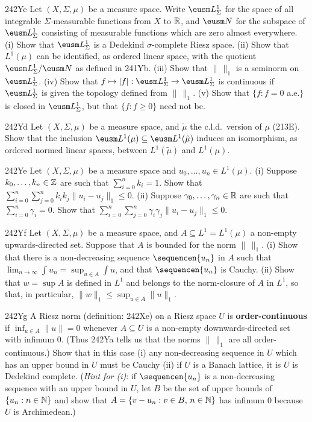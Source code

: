 {\spheader 242Yc Let $(X,\Sigma,\mu)$ be a measure space.   Write
$\eusm L^1_{\Sigma}$ for the space of all integrable
$\Sigma$-measurable functions
from $X$ to $\Bbb R$, and  $\eusm N$ for the subspace of
$\eusm L^1_{\Sigma}$ consisting of measurable functions which
are
zero almost everywhere.   (i) Show that $\eusm L^1_{\Sigma}$
is a
Dedekind $\sigma$-complete Riesz space.   (ii) Show that $L^1(\mu)$
can
be identified, as ordered linear space, with the quotient
$\eusm L^1_{\Sigma}/\eusm N$ as defined in 241Yb.   (iii) Show
that $\|\,\|_1$ is a seminorm on $\eusm L^1_{\Sigma}$.
(iv) Show that
$f\mapsto |f|:\eusm L^1_{\Sigma}\to\eusm L^1_{\Sigma}$
is continuous if $\eusm L^1_{\Sigma}$ is
given the topology defined from $\|\,\|_1$.   (v) Show that
$\{f:f=0$ a.e.$\}$ is closed in $\eusm L^1_{\Sigma}$, but that
$\{f:f\ge 0\}$ need not be.

\spheader 242Yd Let $(X,\Sigma,\mu)$ be a measure space, and
$\tilde\mu$ the c.l.d.\ version of $\mu$ (213E).   Show that the
inclusion $\eusm L^1(\mu)\subseteq\eusm L^1(\tilde\mu)$ induces an
isomorphism, as ordered normed linear spaces, between $L^1(\tilde\mu)$
and $L^1(\mu)$.

\spheader 242Ye Let $(X,\Sigma,\mu)$ be a measure space and
$u_0,\ldots,u_n\in L^1(\mu)$.   (i) Suppose $k_0,\ldots,k_n\in\Bbb Z$
are such that $\sum_{i=0}^nk_i=1$.   Show that
$\sum_{i=0}^n\sum_{j=0}^nk_ik_j\|u_i-u_j\|_1\le 0$.      (ii) Suppose
$\gamma_0,\ldots,\gamma_n\in\Bbb R$ are such that
$\sum_{i=0}^n\gamma_i=0$.   Show that
$\sum_{i=0}^n\sum_{j=0}^n\gamma_i\gamma_j\|u_i-u_j\|_1\le 0$.

\spheader 242Yf Let $(X,\Sigma,\mu)$ be a measure space, and
$A\subseteq L^1=L^1(\mu)$ a non-empty upwards-directed set.   Suppose
that $A$ is bounded for the norm $\|\,\|_1$.   (i) Show that there is
a
non-decreasing sequence $\sequencen{u_n}$ in $A$ such that
$\lim_{n\to\infty}\int u_n=\sup_{u\in A}\int u$, and that
$\sequencen{u_n}$ is Cauchy.   (ii) Show that $w=\sup A$ is defined in
$L^1$ and belongs to the norm-closure of $A$ in $L^1$, so that, in
particular, $\|w\|_1\le\sup_{u\in A}\|u\|_1$.

\spheader 242Yg A Riesz norm (definition:  242Xe) on a Riesz space
$U$ is {\bf order-continuous} if $\inf_{u\in A}\|u\|=0$ whenever
$A\subseteq U$
is a non-empty downwards-directed set with infimum $0$.   (Thus 242Ya
tells us that the norms $\|\,\|_1$ are all order-continuous.)
Show that in this case (i) any non-decreasing sequence in $U$
which has an upper bound in $U$ must be Cauchy (ii) if $U$ is a
Banach lattice, it is $U$ is Dedekind
complete.   ({\it Hint for (i)\/}: if $\sequencen{u_n}$ is a
non-decreasing sequence with an upper bound in $U$, let $B$ be the set
of upper bounds of $\{u_n:n\in\Bbb N\}$ and show that
$A=\{v-u_n:v\in B,\,n\in\Bbb N\}$ has infimum $0$ because $U$ is
Archimedean.)

}
